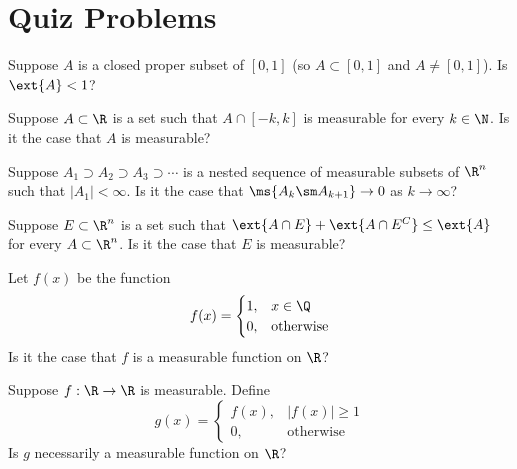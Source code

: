 \newpage
\section{Quiz Problems}

\begin{quiz}
Suppose $A$ is a closed proper subset of $[0,1]$ (so $A \subset [0,1]$ and $A \neq [0,1]$). Is $\ext{A}<1$?
\end{quiz}


\begin{quiz}
Suppose $A \subset \R$ is a set such that $A \cap [-k,k]$ is measurable for every $k \in \N$. Is it the case that $A$ is measurable? 
\end{quiz}





\begin{quiz}
Suppose $A_1 \supset A_2 \supset A_3 \supset \cdots$ is a nested sequence of measurable subsets of $\R^n$ such that $|A_1|<\infty$. Is it the case that $\ms{A_k \sm A_{k+1}} \to 0$ as $k \to \infty$?
\end{quiz}


\begin{quiz}
Suppose $E \subset \R^n$ is a set such that $\ext{A \cap E} + \ext{A \cap E^C} \leq \ext{A}$ for every $A \subset \R^n$. Is it the case that $E$ is measurable? 
\end{quiz}









\begin{quiz}
Let $f(x)$ be the function
	\[
	f(x)=
	\begin{cases}
	1, & x \in \Q \\
	0, & \text{otherwise}
	\end{cases}
	\]
Is it the case that $f$ is a measurable function on $\R$?
\end{quiz}


\begin{quiz}
Suppose $f: \R \to \R$ is measurable. Define
	\[
	g(x)=
	\begin{cases}
	f(x), & |f(x)| \geq 1 \\
	0, & \text{otherwise}
	\end{cases}
	\]
Is $g$ necessarily a measurable function on $\R$?
\end{quiz}



